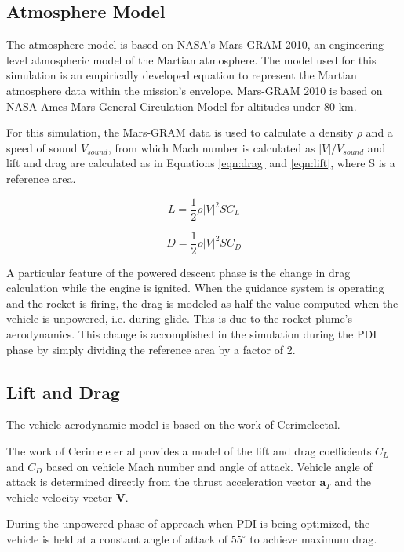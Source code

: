 \subsection{Atmosphere Model}
The atmosphere model is based on NASA's Mars-GRAM 2010\:\cite{MARSGRAM}, an engineering-level atmospheric model of the Martian atmosphere. The model used for this simulation is an empirically developed equation to represent the Martian atmosphere data within the mission's envelope. Mars-GRAM 2010 is based on NASA Ames Mars General Circulation Model for altitudes under 80 km.

For this simulation, the Mars-GRAM data is used to calculate a density $\rho$ and a speed of sound $V_{sound}$, from which Mach number is calculated as $|V|/V_{sound}$ and lift and drag are calculated as in Equations \ref{eqn:drag} and \ref{eqn:lift}, where S is a reference area.

\begin{equation}
\label{eqn:lift}
L = \frac{1}{2} \rho |V|^2 S C_L
\end{equation}

\begin{equation}
\label{eqn:drag}
D = \frac{1}{2} \rho |V|^2 S C_D
\end{equation}

A particular feature of the powered descent phase is the change in drag calculation while the engine is ignited. When the guidance system is operating and the rocket is firing, the drag is modeled as half the value computed when the vehicle is unpowered, i.e. during glide. This is due to the rocket plume's aerodynamics. This change is accomplished in the simulation during the PDI phase by simply dividing the reference area by a factor of 2. 

\subsection{Lift and Drag}
The vehicle aerodynamic model is based on the work of Cerimele\:et\:al\:\cite{CERIMELE}. 

The work of Cerimele er al provides a model of the lift and drag coefficients $C_L$ and $C_D$ based on vehicle Mach number and angle of attack. Vehicle angle of attack is determined directly from the thrust acceleration vector $\bm{a}_T$ and the vehicle velocity vector $\bm{V}$. 

During the unpowered phase of approach when PDI is being optimized, the vehicle is held at a constant angle of attack of $55^{\circ}$ to achieve maximum drag. 

